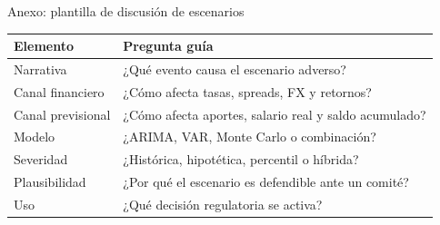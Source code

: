 \documentclass[10pt,aspectratio=169]{beamer}
\begin{document}
\begin{frame}{Anexo: plantilla de discusión de escenarios}
\small
\begin{tabular}{p{2.7cm}p{8.3cm}}
\toprule
Elemento & Pregunta guía \\
\midrule
Narrativa & ¿Qué evento causa el escenario adverso? \\
Canal financiero & ¿Cómo afecta tasas, spreads, FX y retornos? \\
Canal previsional & ¿Cómo afecta aportes, salario real y saldo acumulado? \\
Modelo & ¿ARIMA, VAR, Monte Carlo o combinación? \\
Severidad & ¿Histórica, hipotética, percentil o híbrida? \\
Plausibilidad & ¿Por qué el escenario es defendible ante un comité? \\
Uso & ¿Qué decisión regulatoria se activa? \\
\bottomrule
\end{tabular}
\end{frame}

\end{document}
